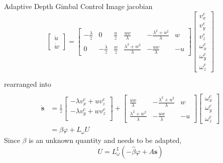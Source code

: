 \documentclass[9pt]{beamer}
\begin{document}
\begin{frame}{Adaptive Depth Gimbal Control}
Image jacobian
\begin{equation}
\begin{bmatrix}
\dot{u} \\ \dot{w}
\end{bmatrix}
=\begin{bmatrix}
-\frac{\lambda}{z} & 0 & \frac{u}{z} & \frac{uw}{\lambda} & -\frac{\lambda^2+u^2}{\lambda} & w \\
0 & -\frac{\lambda}{z} & \frac{w}{z} & \frac{\lambda^2+w^2}{\lambda} & -\frac{uw}{\lambda} & -u
\end{bmatrix}
\begin{bmatrix}
v_x^c \\ v_y^c \\ v_z^c \\
\omega_x^c \\ \omega_y^c \\ \omega_z^c
\end{bmatrix}
\end{equation}

rearranged into 
\begin{align}
\\\dot{\mathbf{s}}
&=\frac{1}{z}
\begin{bmatrix}
-\lambda v_x^c+uv_z^c \\
-\lambda v_y^c+wv_z^c \\
\end{bmatrix}
+\begin{bmatrix}
\frac{uw}{\lambda} & -\frac{\lambda^2+u^2}{\lambda} & w \\
\frac{\lambda^2+w^2}{\lambda} & -\frac{uw}{\lambda} & -u
\end{bmatrix}
\begin{bmatrix}
\omega_x^c \\ \omega_y^c \\ \omega_z^c
\end{bmatrix} \\
&=\beta\varphi + L_{\omega}U
\end{align}
Since $\beta$ is an unknown quantity and needs to be adapted,
\begin{equation}
U=L_\omega^\sharp(-\hat{\beta}\varphi+A\mathbf{s})
\end{equation}
\end{frame}
\end{document}
